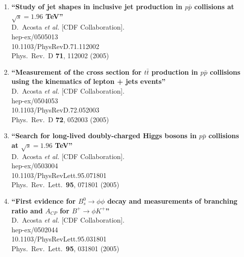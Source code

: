 \documentclass{article}
\begin{document}
\begin{enumerate}
\item%
{\bf ``Study of jet shapes in inclusive jet production in $p\bar{p}$ collisions at $\sqrt{s}=1.96$ TeV''}
  \\{}D.~Acosta {\it et al.}  [CDF Collaboration].
  \\{}hep-ex/0505013
    \\{}10.1103/PhysRevD.71.112002
\\{}Phys.\ Rev.\ D {\bf 71}, 112002 (2005) %


\item%
{\bf ``Measurement of the cross section for $t\bar{t}$ production in $p\bar{p}$ collisions using the kinematics of lepton + jets events''}
  \\{}D.~Acosta {\it et al.}  [CDF Collaboration].
  \\{}hep-ex/0504053
    \\{}10.1103/PhysRevD.72.052003
\\{}Phys.\ Rev.\ D {\bf 72}, 052003 (2005) %


\item%
{\bf ``Search for long-lived doubly-charged Higgs bosons in $p\bar{p}$ collisions at $\sqrt{s} = 1.96$ TeV''}
  \\{}D.~Acosta {\it et al.}  [CDF Collaboration].
  \\{}hep-ex/0503004
    \\{}10.1103/PhysRevLett.95.071801
\\{}Phys.\ Rev.\ Lett.\  {\bf 95}, 071801 (2005) %


\item%
{\bf ``First evidence for $B_s^0 \to \phi \phi$ decay and measurements of branching ratio and $A_{CP}$ for $B^+ \to \phi K^+$''}
  \\{}D.~Acosta {\it et al.}  [CDF Collaboration].
  \\{}hep-ex/0502044
    \\{}10.1103/PhysRevLett.95.031801
\\{}Phys.\ Rev.\ Lett.\  {\bf 95}, 031801 (2005) %



\end{enumerate}
\end{document}

